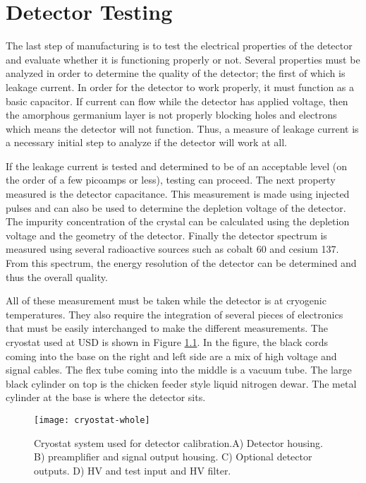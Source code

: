\chapter{Detector Testing}
The last step of manufacturing is to test the electrical properties of the detector and evaluate whether it is functioning properly or not.
Several properties must be analyzed in order to determine the quality of the detector; the first of which is leakage current.
In order for the detector to work properly, it must function as a basic capacitor.
If current can flow while the detector has applied voltage, then the amorphous germanium layer is not properly blocking holes and electrons which means the detector will not function.
Thus, a measure of leakage current is a necessary initial step to analyze if the detector will work at all.

If the leakage current is tested and determined to be of an acceptable level (on the order of a few picoamps or less), testing can proceed.
The next property measured is the detector capacitance.
This measurement is made using injected pulses and can also be used to determine the depletion voltage of the detector.
The impurity concentration of the crystal can be calculated using the depletion voltage and the geometry of the detector.
Finally the detector spectrum is measured using several radioactive sources such as cobalt 60 and cesium 137.
From this spectrum, the energy resolution of the detector can be determined and thus the overall quality.

All of these measurement must be taken while the detector is at cryogenic temperatures.
They also require the integration of several pieces of electronics that must be easily interchanged to make the different measurements.
The cryostat used at USD is shown in Figure \ref{fig:cryostat-whole}.
In the figure, the black cords coming into the base on the right and left side are a mix of high voltage and signal cables.
The flex tube coming into the middle is a vacuum tube.
The large black cylinder on top is the chicken feeder style liquid nitrogen dewar.
The metal cylinder at the base is where the detector sits.
\begin{figure}[htpb]
\centering
\texttt{[image: cryostat-whole]}
  \caption{Cryostat system used for detector calibration.A) Detector housing. B) preamplifier and signal output housing. C) Optional detector outputs. D) HV and test input  and HV filter.}
\label{fig:cryostat-whole}
\end{figure}

